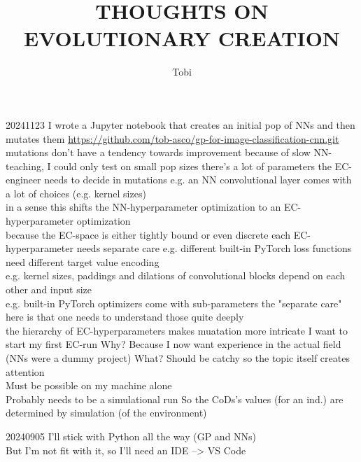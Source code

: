 \documentclass{article}\usepackage[margin=2cm]{geometry}
\title{THOUGHTS ON EVOLUTIONARY CREATION}
\author{Tobi}
\begin{document}
\maketitle
\begin{cascade}
    20241123
    \stepin
    I wrote a Jupyter notebook that creates an initial pop of NNs and then mutates them
    \stepin
    \url{https://github.com/tob-asco/gp-for-image-classification-cnn.git}\\
    mutations don't have a tendency towards improvement
    \stepin
    because of slow NN-teaching, I could only test on small pop sizes
    \stepout
    there's a lot of parameters the EC-engineer needs to decide in mutations
    \stepin
    e.g. an NN convolutional layer comes with a lot of choices (e.g. kernel sizes)\\
    in a sense this shifts the NN-hyperparameter optimization to an EC-hyperparameter optimization\\
    because the EC-space is either tightly bound or even discrete each EC-hyperparameter needs separate care
    \stepin
    e.g. different built-in PyTorch loss functions need different target value encoding\\
    e.g. kernel sizes, paddings and dilations of convolutional blocks depend on each other and input size\\
    e.g. built-in PyTorch optimizers come with sub-parameters
    \stepin
    the "separate care" here is that one needs to understand those quite deeply\\
    the hierarchy of EC-hyperparameters makes muatation more intricate
    \stepout
    \stepout
    \stepout
    \stepout
    I want to start my first EC-run
    \stepin
    Why?
    \stepin
    Because I now want experience in the actual field (NNs were a dummy project)
    \stepout
    What?
    \stepin
    Should be catchy so the topic itself creates attention\\
    Must be possible on my machine alone\\
    Probably needs to be a simulational run
    \stepin
    So the CoDs's values (for an ind.) are determined by simulation (of the environment)
\end{cascade}
\begin{cascade}
    20240905
    \stepin
    I'll stick with Python all the way (GP and NNs)\\
    But I'm not fit with it, so I'll need an IDE --> VS Code
\end{cascade}
\end{document}
